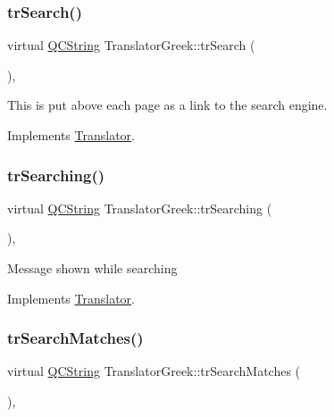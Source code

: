 \subsubsection{\texorpdfstring{trSearch()}{trSearch()}}
{\footnotesize\ttfamily virtual \mbox{\hyperlink{class_q_c_string}{Q\+C\+String}} Translator\+Greek\+::tr\+Search (\begin{DoxyParamCaption}{ }\end{DoxyParamCaption})\hspace{0.3cm}{\ttfamily [inline]}, {\ttfamily [virtual]}}

This is put above each page as a link to the search engine. 

Implements \mbox{\hyperlink{class_translator}{Translator}}.

\mbox{\label{class_translator_greek_aca2f77e74095b3752ae75e20359b3887}} 
\subsubsection{\texorpdfstring{trSearching()}{trSearching()}}
{\footnotesize\ttfamily virtual \mbox{\hyperlink{class_q_c_string}{Q\+C\+String}} Translator\+Greek\+::tr\+Searching (\begin{DoxyParamCaption}{ }\end{DoxyParamCaption})\hspace{0.3cm}{\ttfamily [inline]}, {\ttfamily [virtual]}}

Message shown while searching 

Implements \mbox{\hyperlink{class_translator}{Translator}}.

\mbox{\label{class_translator_greek_abab362105ce2f228bc767c390bb10d8d}} 
\subsubsection{\texorpdfstring{trSearchMatches()}{trSearchMatches()}}
{\footnotesize\ttfamily virtual \mbox{\hyperlink{class_q_c_string}{Q\+C\+String}} Translator\+Greek\+::tr\+Search\+Matches (\begin{DoxyParamCaption}{ }\end{DoxyParamCaption})\hspace{0.3cm}{\ttfamily [inline]}, {\ttfamily [virtual]}}

